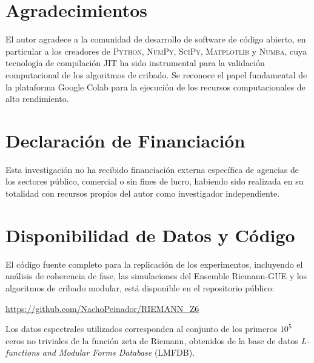 \documentclass[12pt, a4paper]{article}
\theoremstyle{plain}
\theoremstyle{definition}
\theoremstyle{remark}
\begin{document}
\section*{Agradecimientos}
El autor agradece a la comunidad de desarrollo de software de código abierto, en particular a los creadores de \textsc{Python}, \textsc{NumPy}, \textsc{SciPy}, \textsc{Matplotlib} y \textsc{Numba}, cuya tecnología de compilación JIT ha sido instrumental para la validación computacional de los algoritmos de cribado. Se reconoce el papel fundamental de la plataforma Google Colab para la ejecución de los recursos computacionales de alto rendimiento.

\section*{Declaración de Financiación}
Esta investigación no ha recibido financiación externa específica de agencias de los sectores público, comercial o sin fines de lucro, habiendo sido realizada en su totalidad con recursos propios del autor como investigador independiente.

\section*{Disponibilidad de Datos y Código}
El código fuente completo para la replicación de los experimentos, incluyendo el análisis de coherencia de fase, las simulaciones del Ensemble Riemann-GUE y los algoritmos de cribado modular, está disponible en el repositorio público:
\begin{center}
\url{https://github.com/NachoPeinador/RIEMANN_Z6}
\end{center}
Los datos espectrales utilizados corresponden al conjunto de los primeros $10^5$ ceros no triviales de la función zeta de Riemann, obtenidos de la base de datos \textit{L-functions and Modular Forms Database} (LMFDB).
\end{document}
